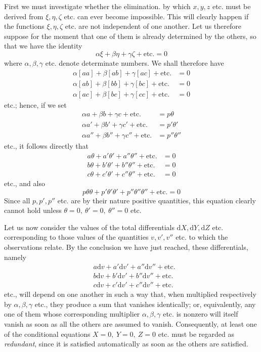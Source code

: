 First we must investigate whether the elimination. by which \(x,y,z\) etc. must be derived from \(\xi,\eta,\zeta\) etc. can ever become impossible. This will clearly happen if the functions \(\xi,\eta,\zeta\) etc. are not independent of one another. Let us therefore suppose for the moment that one of them is already determined by the others, so that we have the identity
\[
\alpha\xi+\beta\eta+\gamma\zeta+\text{etc.}=0
\]
where \(\alpha,\beta,\gamma\) etc. denote determinate numbers. We shall therefore have
\[
\begin{aligned}
\alpha[aa]+\beta[ab]+\gamma[ac]+\text{etc.}&=0\\
\alpha[ab]+\beta[bb]+\gamma[bc]+\text{etc.}&=0\\
\alpha[ac]+\beta[bc]+\gamma[cc]+\text{etc.}&=0
\end{aligned}
\]
etc.; hence, if we set
\[
\begin{aligned}
\alpha a+\beta b+\gamma c+\text{etc.}&=p\theta\\
\alpha a'+\beta b'+\gamma c'+\text{etc.}&=p'\theta'\\
\alpha a''+\beta b''+\gamma c''+\text{etc.}&=p''\theta''
\end{aligned}
\]
etc., it follows directly that
\[
\begin{aligned}
a\theta+a'\theta'+a''\theta''+\text{etc.}&=0\\
b\theta+b'\theta'+b''\theta''+\text{etc.}&=0\\
c\theta+c'\theta'+c''\theta''+\text{etc.}&=0
\end{aligned}
\]
etc., and also
\[
p\theta\theta+p'\theta'\theta'+p''\theta''\theta''+\text{etc.}=0
\]
Since all \(p,p',p''\) etc. are by their nature positive quantities, this equation clearly cannot hold unless \(\theta=0,\ \theta'=0,\ \theta''=0\) etc.

Let us now consider the values of the total differentials \(\mathrm dX,\mathrm dY,\mathrm dZ\) etc. corresponding to those values of the quantities \(v,v',v''\) etc. to which the observations relate. By the conclusion we have just reached, these differentials, namely
\[
\begin{aligned}
&a\mathrm dv+a'\mathrm dv'+a''\mathrm dv''+\text{etc.}\\
&b\mathrm dv+b'\mathrm dv'+b''\mathrm dv''+\text{etc.}\\
&c\mathrm dv+c'\mathrm dv'+c''\mathrm dv''+\text{etc.}
\end{aligned}
\]
etc., will depend on one another in such a way that, when multiplied respectively by \(\alpha,\beta,\gamma\) etc., they produce a sum that vanishes identically; or, equivalently, any one of them whose corresponding multiplier \(\alpha,\beta,\gamma\) etc. is nonzero will itself vanish as soon as all the others are assumed to vanish. Consequently, at least one of the conditional equations \(X=0,\ Y=0,\ Z=0\) etc. must be regarded as \textit{redundant}, since it is satisfied automatically as soon as the others are satisfied.

